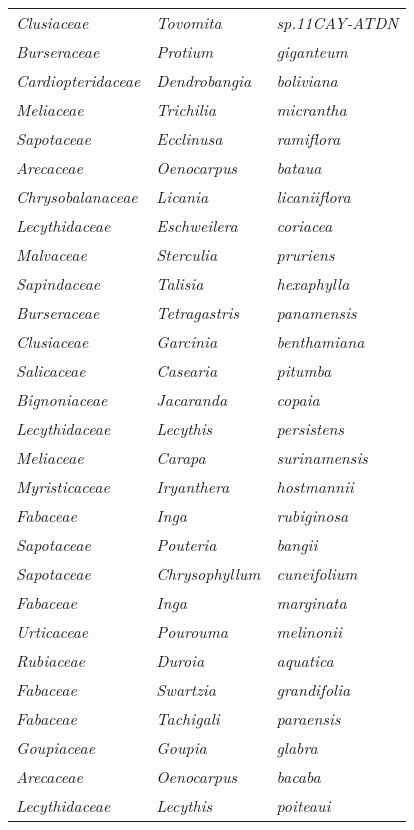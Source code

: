 \documentclass[fleqn,10pt]{ArtEcoFoG} %
\renewenvironment{table}{\begin{table*}}{\end{table*}\ignorespacesafterend}
\begin{document}
\begin{table}
\begin{tabular}[t]{lll}
\em{Clusiaceae} & \em{Tovomita} & \em{sp.11CAY-ATDN}\\
\addlinespace
\em{Burseraceae} & \em{Protium} & \em{giganteum}\\
\em{Cardiopteridaceae} & \em{Dendrobangia} & \em{boliviana}\\
\em{Meliaceae} & \em{Trichilia} & \em{micrantha}\\
\em{Sapotaceae} & \em{Ecclinusa} & \em{ramiflora}\\
\em{Arecaceae} & \em{Oenocarpus} & \em{bataua}\\
\addlinespace
\em{Chrysobalanaceae} & \em{Licania} & \em{licaniiflora}\\
\em{Lecythidaceae} & \em{Eschweilera} & \em{coriacea}\\
\em{Malvaceae} & \em{Sterculia} & \em{pruriens}\\
\em{Sapindaceae} & \em{Talisia} & \em{hexaphylla}\\
\em{Burseraceae} & \em{Tetragastris} & \em{panamensis}\\
\addlinespace
\em{Clusiaceae} & \em{Garcinia} & \em{benthamiana}\\
\em{Salicaceae} & \em{Casearia} & \em{pitumba}\\
\em{Bignoniaceae} & \em{Jacaranda} & \em{copaia}\\
\em{Lecythidaceae} & \em{Lecythis} & \em{persistens}\\
\em{Meliaceae} & \em{Carapa} & \em{surinamensis}\\
\addlinespace
\em{Myristicaceae} & \em{Iryanthera} & \em{hostmannii}\\
\em{Fabaceae} & \em{Inga} & \em{rubiginosa}\\
\em{Sapotaceae} & \em{Pouteria} & \em{bangii}\\
\em{Sapotaceae} & \em{Chrysophyllum} & \em{cuneifolium}\\
\em{Fabaceae} & \em{Inga} & \em{marginata}\\
\addlinespace
\em{Urticaceae} & \em{Pourouma} & \em{melinonii}\\
\em{Rubiaceae} & \em{Duroia} & \em{aquatica}\\
\em{Fabaceae} & \em{Swartzia} & \em{grandifolia}\\
\em{Fabaceae} & \em{Tachigali} & \em{paraensis}\\
\em{Goupiaceae} & \em{Goupia} & \em{glabra}\\
\addlinespace
\em{Arecaceae} & \em{Oenocarpus} & \em{bacaba}\\
\em{Lecythidaceae} & \em{Lecythis} & \em{poiteaui}\\

\end{tabular}
\end{table}
\end{document}
